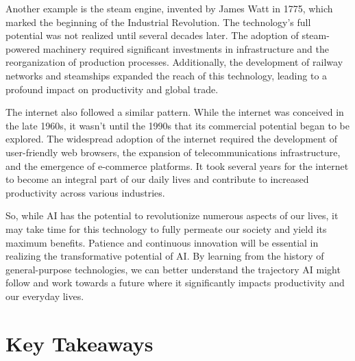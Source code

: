 Another example is the steam engine, invented by James Watt in 1775, which marked the beginning of the Industrial Revolution. The technology's full potential was not realized until several decades later. The adoption of steam-powered machinery required significant investments in infrastructure and the reorganization of production processes. Additionally, the development of railway networks and steamships expanded the reach of this technology, leading to a profound impact on productivity and global trade.

The internet also followed a similar pattern. While the internet was conceived in the late 1960s, it wasn't until the 1990s that its commercial potential began to be explored. The widespread adoption of the internet required the development of user-friendly web browsers, the expansion of telecommunications infrastructure, and the emergence of e-commerce platforms. It took several years for the internet to become an integral part of our daily lives and contribute to increased productivity across various industries.

So, while AI has the potential to revolutionize numerous aspects of our lives, it may take time for this technology to fully permeate our society and yield its maximum benefits. Patience and continuous innovation will be essential in realizing the transformative potential of AI. By learning from the history of general-purpose technologies, we can better understand the trajectory AI might follow and work towards a future where it significantly impacts productivity and our everyday lives.

\section{Key Takeaways}

